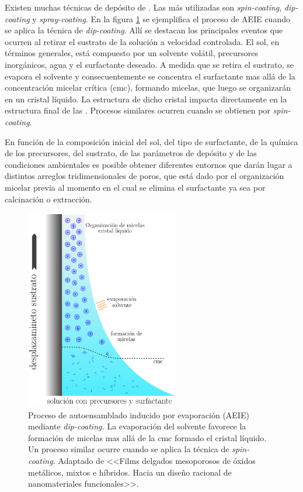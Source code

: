 	 Existen muchas técnicas de depósito de \pdm. Las más utilizadas son \textit{spin-coating}, \textit{dip-coating} y \textit{spray-coating}. En la figura \ref{fig:autoensam} se ejemplifica el proceso de AEIE cuando se aplica la técnica de \textit{dip-coating}. Allí se destacan los principales eventos que ocurren al retirar el sustrato de la solución a velocidad controlada. El sol, en términos generales, está compuesto por un solvente volátil, precursores inorgánicos, agua y el surfactante deseado. A medida que se retira el sustrato, se evapora el solvente y consecuentemente se concentra el surfactante mas allá de la concentración micelar crítica (cmc), formando micelas, que luego se organizarán en un cristal líquido. La estructura de dicho cristal impacta directamente en la estructura final de las \pdm. Procesos similares ocurren cuando se obtienen \pdm\space por \textit{spin-coating}. 
 				
   	 En función de la composición inicial del sol, del tipo de surfactante, de la química de los precursores, del sustrato, de las parámetros de depósito y de las condiciones ambientales es posible obtener diferentes entornos que darán lugar a distintos arreglos tridimensionales de poros, que está dado por el organización micelar previa al momento en el cual se elimina el surfactante ya sea por calcinación o extracción.\cite{Grosso2004,Grosso2002,Crepaldi2002a,Grosso2003,Violi2015} 
		

	 	\begin{figure}[h!]
 				\begin{center}
 				\includegraphics[width=0.60\textwidth]{Esquemas/autoensam.pdf}
 				\caption[Proceso de autoensamblado inducido por evaporación (AEIE)]{Proceso de autoensamblado inducido por evaporación (AEIE) mediante \textit{dip-coating.} La evaporación del solvente favorece la formación de micelas mas allá de la cmc formado el cristal líquido. Un proceso similar ocurre cuando se aplica la técnica de \textit{spin-coating.} Adaptado de <<Films delgados mesoporosos de óxidos metálicos, mixtos e híbridos. Hacia un diseño racional de nanomateriales funcionales>>\cite{Angelome2008}.}
 		   		\label{fig:autoensam}
 		    	\end{center}
 		    	\end{figure}

